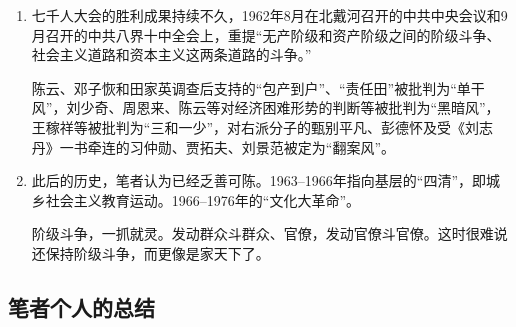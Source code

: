 \begin{enumerate}
\item 七千人大会的胜利成果持续不久，1962年8月在北戴河召开的中共中央会议和9月召开的中共八界十中全会上，重提“无产阶级和资产阶级之间的阶级斗争、社会主义道路和资本主义这两条道路的斗争。”

陈云、邓子恢和田家英调查后支持的“包产到户”、“责任田”被批判为“单干风”，刘少奇、周恩来、陈云等对经济困难形势的判断等被批判为“黑暗风”，王稼祥等被批判为“三和一少”，对右派分子的甄别平凡、彭德怀及受《刘志丹》一书牵连的习仲勋、贾拓夫、刘景范被定为“翻案风”。

\item 此后的历史，笔者认为已经乏善可陈。1963--1966年指向基层的“四清”，即城乡社会主义教育运动。1966--1976年的“文化大革命”。

  阶级斗争，一抓就灵。发动群众斗群众、官僚，发动官僚斗官僚。这时很难说还保持阶级斗争，而更像是家天下了。
\end{enumerate}

\subsection{笔者个人的总结}

